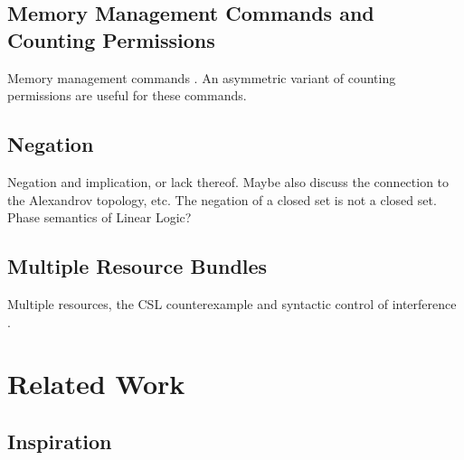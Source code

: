 \documentclass[11pt]{report}
\begin{document}









 

\section{Memory Management Commands and Counting Permissions}

Memory management commands \cite{wmsldetails,lola11}. An asymmetric variant of counting permissions are useful for these commands. 

\section{Negation}
    
Negation and implication, or lack thereof. Maybe also discuss the connection to the Alexandrov topology, etc. The negation of a closed set is not a closed set. Phase semantics of Linear Logic? 

\section{Multiple Resource Bundles}

Multiple resources, the CSL counterexample \cite{Brookes20115} and syntactic control of interference \cite{DBLP:conf/popl/ReddyR12}.  



\chapter{Related Work}

\section{Inspiration}
\end{document}
